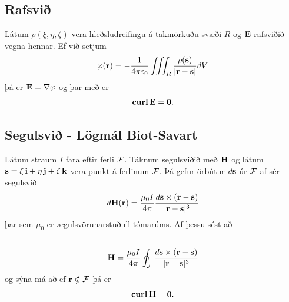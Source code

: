 \documentclass[a4paper,10pt,icelandic]{sphinxmanual}
\begin{document}
\subsection{Rafsvið}
\label{Kafli6:rafsvi}
Látum \(\rho(\xi,\eta,\zeta)\) vera hleðsludreifingu á takmörkuðu
svæði \(R\) og \(\mbox{${\bf E}$}\) rafsviðið vegna hennar. Ef
við setjum
\begin{gather}
\begin{split}\displaystyle \varphi(\mbox{${\bf r}$}) = -\frac{1}{4 \pi \varepsilon_0} \iiint_R \frac{\rho(\mbox{${\bf s}$})}{|\mbox{${\bf r}$}-\mbox{${\bf s}$}|} dV\end{split}\notag
\end{gather}
þá er \(\mbox{${\bf E}$}= \nabla \varphi\) og þar með er
\begin{gather}
\begin{split}\displaystyle \mbox{${\rm\bf curl\,}$}\mbox{${\bf E}$}= \mathbf{0}.\end{split}\notag
\end{gather}

\subsection{Segulsvið - Lögmál Biot-Savart}
\label{Kafli6:segulsvi-logmal-biot-savart}
Látum straum \(I\) fara eftir ferli \(\cal F\). Táknum
segulsviðið með \(\mbox{${\bf H}$}\) og látum
\(\mbox{${\bf s}$}=\xi\,\mbox{${\bf i}$}+\eta\,\mbox{${\bf j}$}+\zeta\,\mbox{${\bf k}$}\)
vera punkt á ferlinum \(\cal F\). Þá gefur örbútur
\(d\mbox{${\bf s}$}\) úr \(\cal F\) af sér segulsvið
\begin{gather}
\begin{split}\displaystyle d\mbox{${\bf H}$}(\mbox{${\bf r}$})=\frac{\mu_0 I}{4\pi}\frac{d\mbox{${\bf s}$}\times(\mbox{${\bf r}$}-\mbox{${\bf s}$})}{|\mbox{${\bf r}$}-\mbox{${\bf s}$}|^3}\end{split}\notag
\end{gather}
þar sem \(\mu_0\) er \emph{s}egulsvörunarstuðull tómarúms. Af þessu
sést að
\begin{gather}
\begin{split}\displaystyle\end{split}\notag\\\begin{split}\mbox{${\bf H}$}=\frac{\mu_0 I}{4\pi}\oint_{\cal F}
\frac{d\mbox{${\bf s}$}\times(\mbox{${\bf r}$}-\mbox{${\bf s}$})}{|\mbox{${\bf r}$}-\mbox{${\bf s}$}|^3}\end{split}\notag
\end{gather}
og sýna má að ef \(\mbox{${\bf r}$}\notin \mathcal{F}\) þá er
\begin{gather}
\begin{split}\displaystyle \mbox{${\rm\bf curl\,}$}\mbox{${\bf H}$}= \mathbf{0}.\end{split}\notag
\end{gather}
\end{document}
